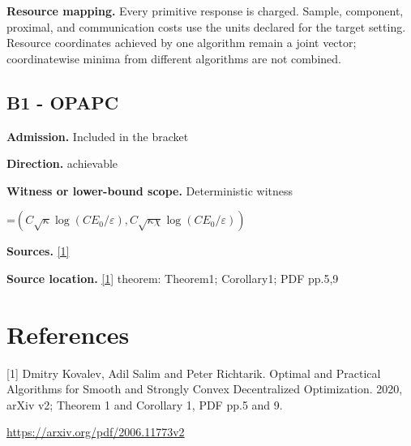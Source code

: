 \documentclass[10pt,a4paper]{article}
\newcommand{\AtlasMath}[1]{\par\begingroup\centering\setbox0=\hbox{$\displaystyle #1$}\ifdim\wd0>1.4\linewidth\typeout{ATLAS WIDE FORMULA: \the\wd0}\fi\ifdim\wd0>\linewidth\resizebox{\linewidth}{!}{\box0}\else\box0\fi\par\endgroup}
\begin{document}
\textbf{Resource mapping.} Every primitive response is charged. Sample, component, proximal, and communication costs use the units declared for the target setting. Resource coordinates achieved by one algorithm remain a joint vector; coordinatewise minima from different algorithms are not combined.

\subsection{B1 - OPAPC}
\textbf{Admission.} Included in the bracket

\textbf{Direction.} achievable

\textbf{Witness or lower-bound scope.} Deterministic witness

\AtlasMath{(C\sqrt\kappa\log(CE_0/\varepsilon),C\sqrt{\kappa\chi}\log(CE_0/\varepsilon))}
\textbf{Sources.} \href{https://arxiv.org/pdf/2006.11773v2}{[1]}

\textbf{Source location.} \href{https://arxiv.org/pdf/2006.11773v2}{[1]} theorem: Theorem1; Corollary1; PDF pp.5,9

\section{References}
[1] Dmitry Kovalev, Adil Salim and Peter Richtarik. Optimal and Practical Algorithms for Smooth and Strongly Convex Decentralized Optimization. 2020, arXiv v2; Theorem 1 and Corollary 1, PDF pp.5 and 9.

\url{https://arxiv.org/pdf/2006.11773v2}
\end{document}
